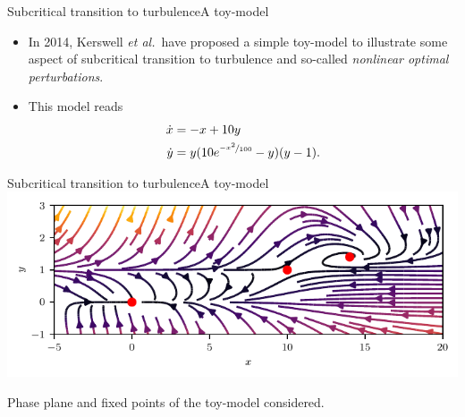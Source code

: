 \documentclass[usenames,dvipsnames,svgnames,10pt,aspectratio=169]{beamer}
\begin{document}
\begin{frame}[t, c]{Subcritical transition to turbulence}{A toy-model}
	\begin{itemize}
		\item In 2014, Kerswell \emph{et al.}\ have proposed a simple toy-model to illustrate some aspect of subcritical transition to turbulence and so-called \emph{nonlinear optimal perturbations}.

		\bigskip

		\item This model reads
		\begin{equation}
			\begin{aligned}
				\dot{x} & = -x + 10y \\
				\dot{y} & = y(10e^{\nicefrac{-x^2}{100}} - y)(y -1).
			\end{aligned}
			\notag
		\end{equation}
	\end{itemize}

	\vspace{1cm}
\end{frame}

\begin{frame}[t, c]{Subcritical transition to turbulence}{A toy-model}
	\centering
	\includegraphics[width=.75\textwidth]{kerswell_phase_plane}

	Phase plane and fixed points of the toy-model considered.

	\vspace{1cm}
\end{frame}
\end{document}
